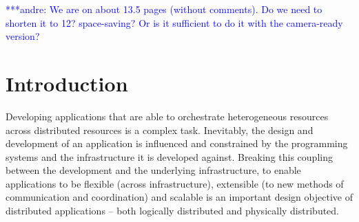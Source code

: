 \documentclass{rspublic}
\newcommand{\alnote}[1]{ {\textcolor{blue} { ***andre: #1 }}}
\newcommand{\alnote}[1]{}
\begin{document}
\begin{abstract}{Replica-Exchange, SAGA, Large-Scale, Production}

\end{abstract}

\alnote{We are on about 13.5 pages (without comments). 
Do we need to shorten it to 12? space-saving? Or is it sufficient
to do it with the camera-ready version?}

\section{Introduction}
Developing applications that are able to orchestrate heterogeneous
resources across distributed resources is a complex task.  Inevitably,
the design and development of an application is influenced and
constrained by the programming systems and the infrastructure it is
developed against. Breaking this coupling between the development and
the underlying infrastructure, to enable applications to be flexible
(across infrastructure), extensible (to new methods of communication
and coordination) and scalable is an important design objective of
distributed applications -- both logically distributed and physically
distributed.
\end{document}
